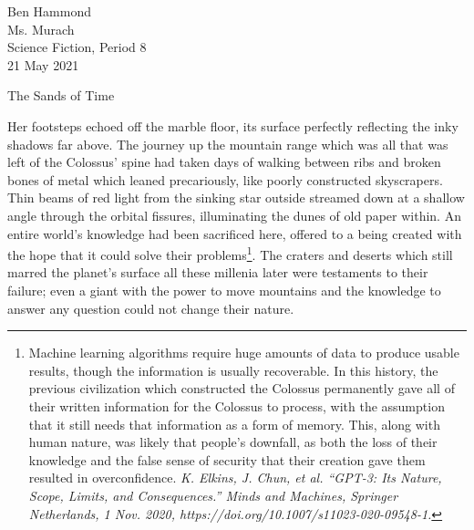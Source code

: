 \documentclass[12pt]{article}
\begin{document}
\begin{flushleft}

Ben Hammond\\
Ms. Murach\\
Science Fiction, Period 8\\
21 May 2021\\


\begin{center}
The Sands of Time
\end{center}


\setlength{\parindent}{0.5in}

Her footsteps echoed off the marble floor, its surface perfectly reflecting the inky shadows far above. The journey up the mountain range which was all that was left of the Colossus’ spine had taken days of walking between ribs and broken bones of metal which leaned precariously, like poorly constructed skyscrapers. Thin beams of red light from the sinking star outside streamed down at a shallow angle through the orbital fissures, illuminating the dunes of old paper within. An entire world’s knowledge had been sacrificed here, offered to a being created with the hope that it could solve their problems\footnote{Machine learning algorithms require huge amounts of data to produce usable results, though the information is usually recoverable. In this history, the previous civilization which constructed the Colossus permanently gave all of their written information for the Colossus to process, with the assumption that it still needs that information as a form of memory. This, along with human nature, was likely that people’s downfall, as both the loss of their knowledge and the false sense of security that their creation gave them resulted in overconfidence.\linebreak
\textit{K. Elkins, J. Chun, et al. “GPT-3: Its Nature, Scope, Limits, and Consequences.” Minds and Machines, Springer Netherlands, 1 Nov. 2020, https://doi.org/10.1007/s11023-020-09548-1.}}. The craters and deserts which still marred the planet’s surface all these millenia later were testaments to their failure; even a giant with the power to move mountains and the knowledge to answer any question could not change their nature.


\end{flushleft}
\end{document}
